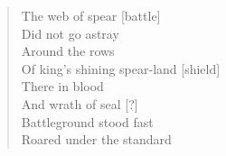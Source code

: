 \begin{paracol}{2}
\begin{quote}
        The web of spear [battle]\\
        Did not go astray \\
        Around the rows\\
        Of king's shining spear-land [shield]\\
        There in blood\\
        And wrath of seal [?]\\
        Battleground stood fast\\
        Roared under the standard
    \end{quote}
\end{paracol}
\begin{translation*}{}
    \begin{parcolumns}[nofirstindent=true]{3}

\end{parcolumns}
\end{translation*}

